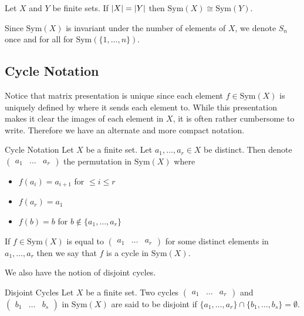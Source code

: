 \documentclass[a4paper]{article}
\begin{document}
\begin{prp}{}{} Let $X$ and $Y$ be finite sets. If $\abs{X}=\abs{Y}$ then $\text{Sym}(X)\cong\text{Sym}(Y)$. 
\end{prp}

Since $\text{Sym}(X)$ is invariant under the number of elements of $X$, we denote $S_n$ once and for all for $\text{Sym}(\{1,\dots,n\})$. 

\subsection{Cycle Notation}
Notice that matrix presentation is unique since each element $f\in\text{Sym}(X)$ is uniquely defined by where it sends each element to. While this presentation makes it clear the images of each element in $X$, it is often rather cumbersome to write. Therefore we have an alternate and more compact notation. 

\begin{defn}{Cycle Notation}{} Let $X$ be a finite set. Let $a_1,\dots,a_r\in X$ be distinct. Then denote $\begin{pmatrix}a_1 & \dots & a_r\end{pmatrix}$ the permutation in $\text{Sym}(X)$ where 
\begin{itemize}
\item $f(a_i)=a_{i+1}$ for $\leq i\leq r$
\item $f(a_r)=a_1$
\item $f(b)=b$ for $b\notin\{a_1,\dots,a_r\}$
\end{itemize}
If $f\in\text{Sym}(X)$ is equal to $\begin{pmatrix}a_1 & \dots & a_r\end{pmatrix}$ for some distinct elements in $a_1,\dots,a_r$ then we say that $f$ is a cycle in $\text{Sym}(X)$. 
\end{defn}

We also have the notion of disjoint cycles. 

\begin{defn}{Disjoint Cycles}{} Let $X$ be a finite set. Two cycles $\begin{pmatrix}a_1 & \dots & a_r\end{pmatrix}$ and $\begin{pmatrix}b_1 & \dots & b_s\end{pmatrix}$ in $\text{Sym}(X)$ are said to be disjoint if $\{a_1,\dots,a_r\}\cap\{b_1,\dots,b_s\}=\emptyset$. 
\end{defn}
\end{document}
